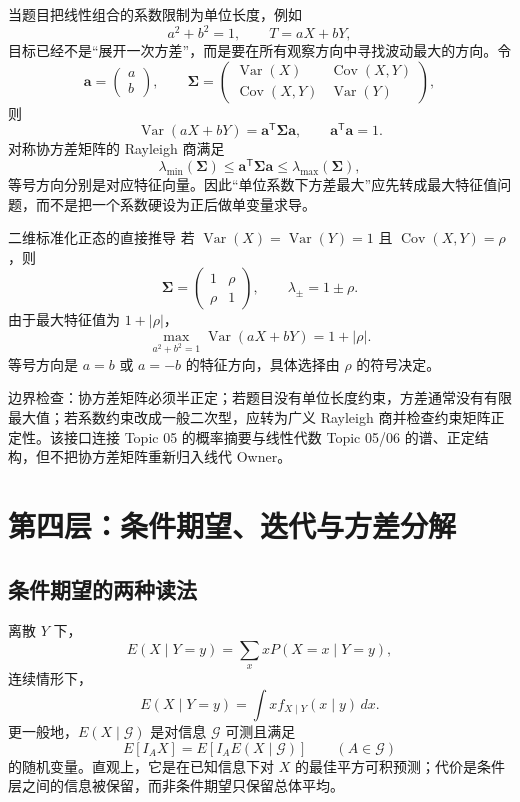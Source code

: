 \documentclass[11pt,a4paper]{ctexart}
\begin{document}
当题目把线性组合的系数限制为单位长度，例如
\[
a^2+b^2=1,\qquad T=aX+bY,
\]
目标已经不是“展开一次方差”，而是要在所有观察方向中寻找波动最大的方向。令
\[
\boldsymbol a=\begin{pmatrix}a\\b\end{pmatrix},\qquad
\boldsymbol\Sigma=\begin{pmatrix}
\operatorname{Var}(X)&\operatorname{Cov}(X,Y)\\
\operatorname{Cov}(X,Y)&\operatorname{Var}(Y)
\end{pmatrix},
\]
则
\[
\operatorname{Var}(aX+bY)=\boldsymbol a^{\mathsf T}\boldsymbol\Sigma\boldsymbol a,
\qquad \boldsymbol a^{\mathsf T}\boldsymbol a=1.
\]
对称协方差矩阵的 Rayleigh 商满足
\[
\lambda_{\min}(\boldsymbol\Sigma)\leq
\boldsymbol a^{\mathsf T}\boldsymbol\Sigma\boldsymbol a\leq
\lambda_{\max}(\boldsymbol\Sigma),
\]
等号方向分别是对应特征向量。因此“单位系数下方差最大”应先转成最大特征值问题，而不是把一个系数硬设为正后做单变量求导。

\begin{methodbox}{二维标准化正态的直接推导}
若 $\operatorname{Var}(X)=\operatorname{Var}(Y)=1$ 且 $\operatorname{Cov}(X,Y)=\rho$，则
\[
\boldsymbol\Sigma=\begin{pmatrix}1&\rho\\\rho&1\end{pmatrix},\qquad
\lambda_{\pm}=1\pm\rho.
\]
由于最大特征值为 $1+\lvert\rho\rvert$，
\[
\max_{a^2+b^2=1}\operatorname{Var}(aX+bY)=1+\lvert\rho\rvert.
\]
等号方向是 $a=b$ 或 $a=-b$ 的特征方向，具体选择由 $\rho$ 的符号决定。
\end{methodbox}

边界检查：协方差矩阵必须半正定；若题目没有单位长度约束，方差通常没有有限最大值；若系数约束改成一般二次型，应转为广义 Rayleigh 商并检查约束矩阵正定性。该接口连接 Topic 05 的概率摘要与线性代数 Topic 05/06 的谱、正定结构，但不把协方差矩阵重新归入线代 Owner。

\section{第四层：条件期望、迭代与方差分解}

\subsection{条件期望的两种读法}

离散 $Y$ 下，
\[
E(X\mid Y=y)=\sum_xxP(X=x\mid Y=y),
\]
连续情形下，
\[
E(X\mid Y=y)=\int xf_{X\mid Y}(x\mid y)\,dx.
\]
更一般地，$E(X\mid\mathcal G)$ 是对信息 $\mathcal G$ 可测且满足
\[
E[I_AX]=E[I_AE(X\mid\mathcal G)]\qquad(A\in\mathcal G)
\]
的随机变量。直观上，它是在已知信息下对 $X$ 的最佳平方可积预测；代价是条件层之间的信息被保留，而非条件期望只保留总体平均。
\end{document}
